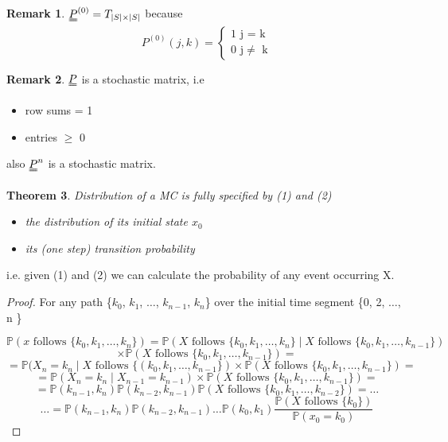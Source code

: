 \documentclass{article}
\newtheorem{thm}{Theorem}
\theoremstyle{definition}
\newtheorem{rem}[thm]{Remark}
\begin{document}
\begin{rem} $\uuline{P}^{(0)} = T_{\mid S \mid \times \mid S \mid}$ because
\[
P^{(0)}(j,k) = \begin{cases} 1 \mbox{ j = k}\\ 0 \mbox{ j} \neq \mbox{ k} \end{cases}
\]
\end{rem}

\begin{rem} $\uuline{P}$ is a stochastic matrix, i.e
\begin{itemize}
\item
row sums = 1
\item
entries $\geq$ 0
\end{itemize}
also $\uuline{P}^n$ is a stochastic matrix.
\end{rem}

\begin{thm} Distribution of a MC is fully specified by (1) and (2)
\begin{itemize}
\item
the distribution of its initial state $x_0$
\item
its (one step) transition probability
\end{itemize}
\end{thm}

i.e. given (1) and (2) we can calculate the probability of any event occurring X.

\begin{proof} For any path \{$k_0$, $k_1$, $\ldots$, $k_{n-1}$, $k_n$\} over the initial time segment \{0, 2, $\ldots$, n \}

\[
\mathbb{P}(x \mbox{ follows } \{k_0, k_1, \ldots, k_n \}) = \mathbb{P}(X \mbox{ follows } \{k_0, k_1, \ldots, k_n \} \mid X \mbox{ follows } \{k_0, k_1, \ldots, k_{n-1} \}) 
\]
\[
\times \mathbb{P}(X \mbox{ follows } \{k_0, k_1, \ldots, k_{n-1} \}) =
\]
\[
= \mathbb{P}(X_n = k_n \mid X \mbox{ follows } \{(k_0, k_1, \ldots, k_{n-1} \}) \times \mathbb{P}(X \mbox{ follows } \{ k_0, k_1, \ldots, k_{n-1} \} ) =
\]
\[ = \mathbb{P}(X_n = k_n \mid X_{n-1} = k_{n-1} ) \times \mathbb{P}(X \mbox{ follows } \{k_0, k_1, \ldots, k_{n-1} \}) =
\]
\[
= \mathbb{P}(k_{n-1}, k_{n} ) \mathbb{P}(k_{n-2}, k_{n-1}) \mathbb{P}(X \mbox{ follows } \{ k_0, k_1, \ldots, k_{n-2} \}) = \ldots
\]
\[
\ldots = \mathbb{P}(k_{n-1}, k_{n} ) \mathbb{P}(k_{n-2}, k_{n-1}) \ldots \mathbb{P}(k_0, k_1) \frac{\mathbb{P}(X \mbox{ follows } \{k_0\})}{\mathbb{P} (x_0 = k_0)}
\]
\end{proof}
\end{document}
